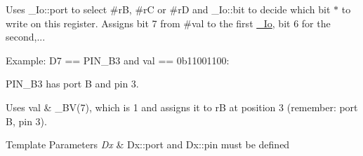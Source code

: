 Uses \+\_\+\+Io\+::port to select \#rB, \#rC or \#rD and \+\_\+\+Io\+::bit to decide which bit $\ast$ to write on this register. Assigns bit 7 from \#val to the first \hyperlink{structports_1_1__Io}{\+\_\+\+Io}, bit 6 for the second,... 

Example\+: D7 == P\+I\+N\+\_\+\+B3 and val == 0b11001100\+:

P\+I\+N\+\_\+\+B3 has port B and pin 3.

Uses {\ttfamily val \& \+\_\+\+B\+V(7)}, which is 1 and assigns it to rB at position 3 (remember\+: port B, pin 3).


\begin{DoxyTemplParams}{Template Parameters}
{\em Dx} & Dx\+::port and Dx\+::pin must be defined \\
\hline
\end{DoxyTemplParams}
